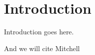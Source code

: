 \section{Introduction}

Introduction goes here.

And we will cite Mitchell \cite{Mitchell:1994:ECA:186092.186116}

